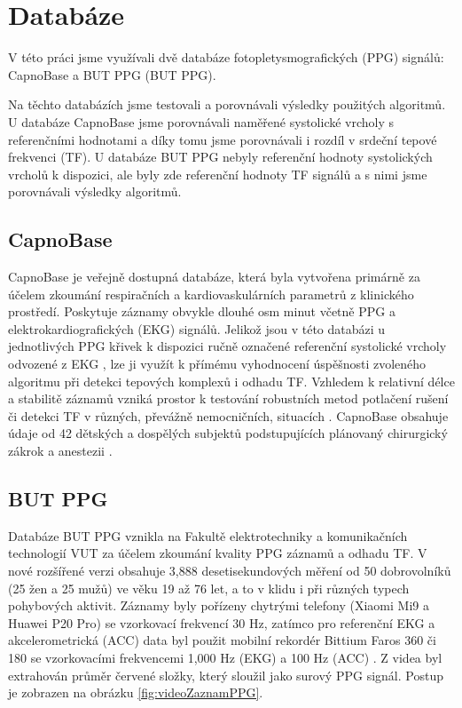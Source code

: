 \raggedbottom
\chapter{Databáze}

V této práci jsme využívali dvě databáze fotopletysmografických (\acs{PPG}) signálů: CapnoBase a \acl{BUT PPG} (BUT PPG).

Na těchto databázích jsme testovali a porovnávali výsledky použitých algoritmů.
U databáze CapnoBase jsme porovnávali naměřené systolické vrcholy s referenčními hodnotami a díky tomu jsme porovnávali i rozdíl v srdeční tepové frekvenci (\acs{TF}).
U databáze \acs{BUT PPG} nebyly referenční hodnoty systolických vrcholů k dispozici, ale byly zde referenční hodnoty \acs{TF} signálů a s nimi jsme porovnávali výsledky algoritmů.

\section{CapnoBase}

CapnoBase je veřejně dostupná databáze, která byla vytvořena primárně za účelem zkoumání respiračních a kardiovaskulárních parametrů z klinického prostředí.
Poskytuje záznamy obvykle dlouhé osm minut včetně \acs{PPG} a elektrokardiografických (EKG) signálů.
Jelikož jsou v této databázi u jednotlivých \acs{PPG} křivek k dispozici ručně označené referenční systolické vrcholy odvozené z EKG \cite{CapnoBase}, lze ji využít k přímému vyhodnocení úspěšnosti zvoleného algoritmu při detekci tepových komplexů i odhadu \acs{TF}.
Vzhledem k relativní délce a stabilitě záznamů vzniká prostor k testování robustních metod potlačení rušení či detekci \acs{TF} v různých, převážně nemocničních, situacích \cite{Karlen2013, Charlton2022}.
CapnoBase obsahuje údaje od 42 dětských a dospělých subjektů podstupujících plánovaný chirurgický zákrok a anestezii \cite{Charlton2022}.

\section{\acs{BUT PPG}}
Databáze \acs{BUT PPG} vznikla na Fakultě elektrotechniky a komunikačních technologií \acs{VUT} za účelem zkoumání kvality \acs{PPG} záznamů a odhadu \acs{TF}.
V nové rozšířené verzi obsahuje 3,888 desetisekundových měření od 50 dobrovolníků (25 žen a 25 mužů) ve věku 19 až 76 let, a to v klidu i při různých typech pohybových aktivit.
Záznamy byly pořízeny chytrými telefony (Xiaomi Mi9 a Huawei P20 Pro) se vzorkovací frekvencí 30 Hz, zatímco pro referenční EKG a akcelerometrická (ACC) data byl použit mobilní rekordér Bittium Faros 360 či 180 se vzorkovacími frekvencemi 1,000 Hz (EKG) a 100 Hz (ACC) \cite{BUT_PPG}.
Z videa byl extrahován průměr červené složky, který sloužil jako surový \acs{PPG} signál.
Postup je zobrazen na obrázku \ref{fig:videoZaznamPPG}.

